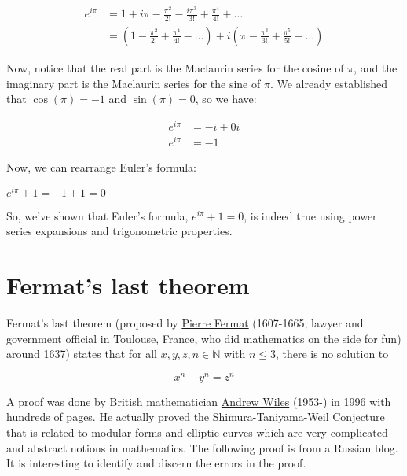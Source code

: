 \documentclass{article}
\begin{document}
\begin{equation*}
  \begin{aligned}
    e^{i\pi} &= 1 + i\pi - \frac{\pi^2}{2!}  - \frac{i\pi^3}{3!} + \frac{\pi^4}{4!}  + \ldots \\
    &= (1 - \frac{\pi^2}{2!} + \frac{\pi^4}{4!} - \ldots)  + i(\pi - \frac{\pi^3}{3!} + \frac{\pi^5}{5!} - \ldots)
  \end{aligned}
\end{equation*}

Now, notice that the real part is the Maclaurin series for the cosine of $\pi$, and the imaginary part is the Maclaurin series for the sine of $\pi$. We already established that $\cos(\pi) = -1$ and $\sin(\pi) = 0$, so we have:

\begin{equation*}
  \begin{aligned}
    e^{i\pi} &= -i + 0i \\
    e^{i\pi} &= -1    
  \end{aligned}
\end{equation*}

Now, we can rearrange Euler's formula:

$e^{i\pi} + 1 = -1 + 1 = 0$

So, we've shown that Euler's formula, $e^{i\pi} + 1 = 0$, is indeed true using power series expansions and trigonometric properties.

\section{Fermat's last theorem}

Fermat's last theorem (proposed by \href{https://en.wikipedia.org/wiki/Pierre_de_Fermat}{Pierre Fermat} (1607-1665, lawyer and government oﬀicial in Toulouse, France, who did mathematics on the side for fun) around 1637) states that for all $x, y, z, n \in \mathbb{N} $ with $n \leq 3$, there is no solution to

\begin{equation*}
  x^n + y^n = z^n
\end{equation*}

A proof was done by British mathematician \href{https://en.wikipedia.org/wiki/Andrew_Wiles}{Andrew Wiles} (1953-) in 1996 with hundreds of pages. He actually proved the Shimura-Taniyama-Weil Conjecture that is related to modular forms and elliptic curves which are very complicated and abstract notions in mathematics. The following proof is from a Russian blog. It is interesting to identify and discern the errors in the proof.
\end{document}
